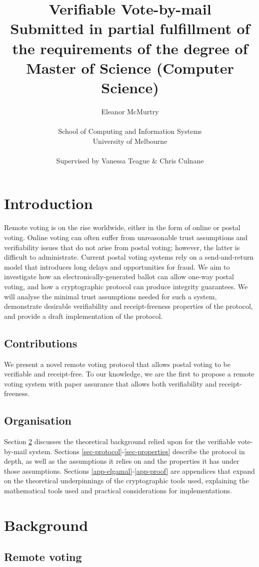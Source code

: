 \documentclass[11pt,twoside,a4paper]{article}
\title{Verifiable Vote-by-mail\\\large Submitted in partial fulfillment of the requirements of the degree of Master of Science (Computer Science)}
\author{Eleanor McMurtry\\\\School of Computing and Information Systems\\University of Melbourne\\\\Supervised by Vanessa Teague \& Chris Culnane}
\theoremstyle{definition}
\begin{document}
\maketitle
\pagebreak
\tableofcontents
\vfill\pagebreak
\section{Introduction}
Remote voting is on the rise worldwide, either in the form of online or postal voting. Online voting can often suffer from unreasonable trust assumptions and verifiability issues that do not arise from postal voting; however, the latter is difficult to administrate. Current postal voting systems rely on a send-and-return model that introduces long delays and opportunities for fraud. We aim to investigate how an electronically-generated ballot can allow one-way postal voting, and how a cryptographic protocol can produce integrity guarantees. We will analyse the minimal trust assumptions needed for such a system, demonstrate desirable verifiability and receipt-freeness properties of the protocol, and provide a draft implementation of the protocol.
\subsection{Contributions}
We present a novel remote voting protocol that allows postal voting to be verifiable and receipt-free. To our knowledge, we are the first to propose a remote voting system with paper assurance that allows both verifiability and receipt-freeness.
\subsection{Organisation}
Section \ref{sec-background} discusses the theoretical background relied upon for the verifiable vote-by-mail system. Sections \ref{sec-protocol}-\ref{sec-properties} describe the protocol in depth, as well as the assumptions it relies on and the properties it has under those assumptions. Sections \ref{app-elgamal}-\ref{app-proof}  are appendices that expand on the theoretical underpinnings of the cryptographic tools used, explaining the mathematical tools used and practical considerations for implementations.
\section{Background}\label{sec-background}
\subsection{Remote voting}
\end{document}
